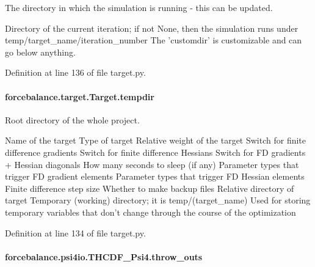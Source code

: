 The directory in which the simulation is running -\/ this can be updated. 

Directory of the current iteration; if not None, then the simulation runs under temp/target\-\_\-name/iteration\-\_\-number The 'customdir' is customizable and can go below anything.

Definition at line 136 of file target.\-py.

\hypertarget{classforcebalance_1_1target_1_1Target_aa1f01b5b78db253b5b66384ed11ed193}{
\paragraph[{tempdir}]{\setlength{\rightskip}{0pt plus 5cm}forcebalance.\-target.\-Target.\-tempdir\hspace{0.3cm}{\ttfamily [inherited]}}}\label{classforcebalance_1_1target_1_1Target_aa1f01b5b78db253b5b66384ed11ed193}


Root directory of the whole project. 

Name of the target Type of target Relative weight of the target Switch for finite difference gradients Switch for finite difference Hessians Switch for F\-D gradients + Hessian diagonals How many seconds to sleep (if any) Parameter types that trigger F\-D gradient elements Parameter types that trigger F\-D Hessian elements Finite difference step size Whether to make backup files Relative directory of target Temporary (working) directory; it is temp/(target\-\_\-name) Used for storing temporary variables that don't change through the course of the optimization 

Definition at line 134 of file target.\-py.

\hypertarget{classforcebalance_1_1psi4io_1_1THCDF__Psi4_a2325dfcc249e17fce558eaff4ed2f7f1}{
\paragraph[{throw\-\_\-outs}]{\setlength{\rightskip}{0pt plus 5cm}forcebalance.\-psi4io.\-T\-H\-C\-D\-F\-\_\-\-Psi4.\-throw\-\_\-outs}}\label{classforcebalance_1_1psi4io_1_1THCDF__Psi4_a2325dfcc249e17fce558eaff4ed2f7f1}


